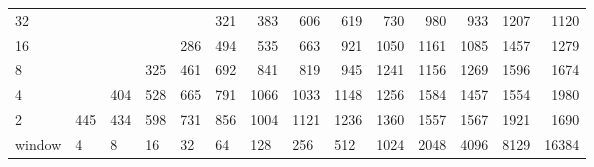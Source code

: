 \begin{table}[]
{\begin{tabular}{lrrrrrrrrrrrrr}
			\multicolumn{1}{|l|}{32} &  &  &  &  & \cellcolor[HTML]{99E600}321 & \cellcolor[HTML]{99E600}383 & \cellcolor[HTML]{E69900}606 & \cellcolor[HTML]{E69900}619 & \cellcolor[HTML]{E69900}730 & \cellcolor[HTML]{E60000}980 & \cellcolor[HTML]{E60000}933 & \cellcolor[HTML]{E60000}1207 & \cellcolor[HTML]{E60000}1120 \\ \cline{1-1}
			\multicolumn{1}{|l|}{16} &  &  &  & \cellcolor[HTML]{99E600}286 & \cellcolor[HTML]{99E600}494 & \cellcolor[HTML]{99E600}535 & \cellcolor[HTML]{E69900}663 & \cellcolor[HTML]{E60000}921 & \cellcolor[HTML]{E60000}1050 & \cellcolor[HTML]{E60000}1161 & \cellcolor[HTML]{E60000}1085 & \cellcolor[HTML]{9900E6}1457 & \cellcolor[HTML]{9900E6}1279 \\ \cline{1-1}
			\multicolumn{1}{|l|}{8} &  &  & \cellcolor[HTML]{99E600}325 & \cellcolor[HTML]{99E600}461 & \cellcolor[HTML]{E69900}692 & \cellcolor[HTML]{E69900}841 & \cellcolor[HTML]{E69900}819 & \cellcolor[HTML]{E60000}945 & \cellcolor[HTML]{9900E6}1241 & \cellcolor[HTML]{E60000}1156 & \cellcolor[HTML]{9900E6}1269 & \cellcolor[HTML]{4C00E6}1596 & \cellcolor[HTML]{4C00E6}1674 \\ \cline{1-1}
			\multicolumn{1}{|l|}{4} &  & \cellcolor[HTML]{99E600}404 & \cellcolor[HTML]{99E600}528 & \cellcolor[HTML]{E69900}665 & \cellcolor[HTML]{E69900}791 & \cellcolor[HTML]{E60000}1066 & \cellcolor[HTML]{E60000}1033 & \cellcolor[HTML]{E60000}1148 & \cellcolor[HTML]{9900E6}1256 & \cellcolor[HTML]{4C00E6}1584 & \cellcolor[HTML]{9900E6}1457 & \cellcolor[HTML]{9900E6}1554 & \cellcolor[HTML]{4C00E6}1980 \\ \cline{1-1}
			\multicolumn{1}{|l|}{2} & \cellcolor[HTML]{99E600}445 & \cellcolor[HTML]{99E600}434 & \cellcolor[HTML]{E69900}598 & \cellcolor[HTML]{E69900}731 & \cellcolor[HTML]{E69900}856 & \cellcolor[HTML]{E60000}1004 & \cellcolor[HTML]{E60000}1121 & \cellcolor[HTML]{E60000}1236 & \cellcolor[HTML]{9900E6}1360 & \cellcolor[HTML]{9900E6}1557 & \cellcolor[HTML]{9900E6}1567 & \cellcolor[HTML]{4C00E6}1921 & \cellcolor[HTML]{4C00E6}1690 \\ \hline
			\multicolumn{1}{l|}{window} & \multicolumn{1}{l|}{4} & \multicolumn{1}{l|}{8} & \multicolumn{1}{l|}{16} & \multicolumn{1}{l|}{32} & \multicolumn{1}{l|}{64} & \multicolumn{1}{l|}{128} & \multicolumn{1}{l|}{256} & \multicolumn{1}{l|}{512} & \multicolumn{1}{l|}{1024} & \multicolumn{1}{l|}{2048} & \multicolumn{1}{l|}{4096} & \multicolumn{1}{l|}{8129} & \multicolumn{1}{l|}{16384} \\ \cline{2-14} 
		\end{tabular}
	}
\end{table}














